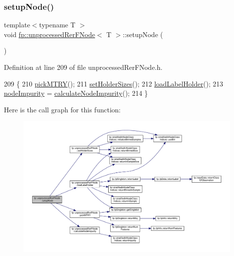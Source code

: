 \subsubsection{\texorpdfstring{setup\+Node()}{setupNode()}}
{\footnotesize\ttfamily template$<$typename T $>$ \\
void \hyperlink{classfp_1_1unprocessedRerFNode}{fp\+::unprocessed\+Rer\+F\+Node}$<$ T $>$\+::setup\+Node (\begin{DoxyParamCaption}{ }\end{DoxyParamCaption})\hspace{0.3cm}{\ttfamily [inline]}}



Definition at line 209 of file unprocessed\+Rer\+F\+Node.\+h.


\begin{DoxyCode}
209                                        \{
210                     \hyperlink{classfp_1_1unprocessedRerFNode_af4593ac3feb0551307f5a863e109dd30}{pickMTRY}();
211                     \hyperlink{classfp_1_1unprocessedRerFNode_a0fccfed626582cf730f6302fc2f703c4}{setHolderSizes}();
212                     \hyperlink{classfp_1_1unprocessedRerFNode_ad4ed23c3eecd133c0f194b94d7e75404}{loadLabelHolder}();
213                     \hyperlink{classfp_1_1unprocessedRerFNode_a5d7bc15c3a0717abefc4845aec168167}{nodeImpurity} = \hyperlink{classfp_1_1unprocessedRerFNode_ac86ccad68a93a1957b7563244c03c0c0}{calculateNodeImpurity}();
214                 \}
\end{DoxyCode}
Here is the call graph for this function\+:
\nopagebreak
\begin{figure}[H]
\begin{center}
\leavevmode
\includegraphics[width=350pt]{classfp_1_1unprocessedRerFNode_a5ec1c45ede99474478d616f748c733ba_cgraph}
\end{center}
\end{figure}


